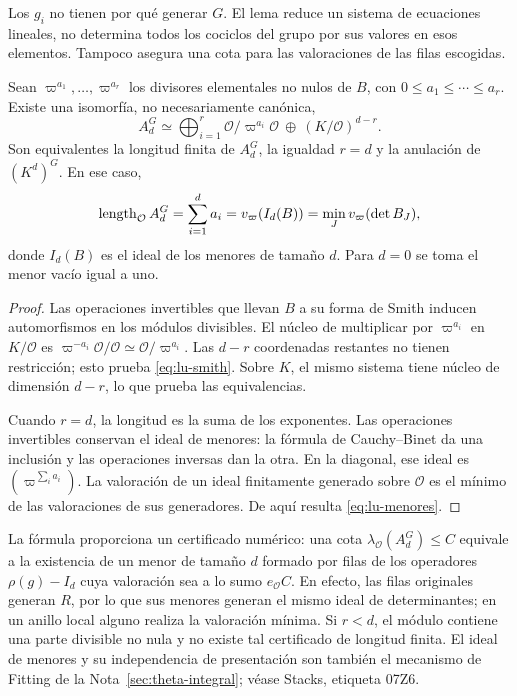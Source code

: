 Los $g_i$ no tienen por qué generar $G$. El lema reduce un sistema
de ecuaciones lineales, no determina todos los cociclos del grupo
por sus valores en esos elementos. Tampoco asegura una cota para
las valoraciones de las filas escogidas.

\begin{proposicion}
\label{prop:lu-smith}
Sean $\varpi^{a_1},\ldots,\varpi^{a_r}$ los divisores elementales
no nulos de $B$, con $0\le a_1\le\cdots\le a_r$. Existe una
isomorfía, no necesariamente canónica,
\begin{equation}
 A_d^G\simeq\bigoplus_{i=1}^r\mathcal O/\varpi^{a_i}\mathcal O
                    \ \oplus\ (K/\mathcal O)^{d-r}.
 \label{eq:lu-smith}
\end{equation}
Son equivalentes la longitud finita de $A_d^G$, la igualdad $r=d$
y la anulación de $(K^d)^G$. En ese caso,
\begin{equation}
 \operatorname{length}_{\mathcal O}A_d^G
   =\sum_{i=1}^d a_i
   =v_\varpi(I_d(B))
   =\min_Jv_\varpi(\det B_J),
 \label{eq:lu-menores}
\end{equation}
donde $I_d(B)$ es el ideal de los menores de tamaño $d$.
Para $d=0$ se toma el menor vacío igual a uno.
\end{proposicion}
\begin{proof}
Las operaciones invertibles que llevan $B$ a su forma de Smith
inducen automorfismos en los módulos divisibles. El núcleo de
multiplicar por $\varpi^{a_i}$ en $K/\mathcal O$ es
$\varpi^{-a_i}\mathcal O/\mathcal O\simeq\mathcal O/\varpi^{a_i}$.
Las $d-r$ coordenadas restantes no tienen restricción; esto prueba
\eqref{eq:lu-smith}. Sobre $K$, el mismo sistema tiene núcleo de
dimensión $d-r$, lo que prueba las equivalencias.

Cuando $r=d$, la longitud es la suma de los exponentes. Las
operaciones invertibles conservan el ideal de menores: la fórmula
de Cauchy--Binet da una inclusión y las operaciones inversas dan
la otra. En la diagonal, ese ideal es
$(\varpi^{\sum_i a_i})$. La valoración de un ideal finitamente
generado sobre $\mathcal O$ es el mínimo de las valoraciones de
sus generadores. De aquí resulta \eqref{eq:lu-menores}.
\end{proof}

La fórmula proporciona un certificado numérico: una cota
$\lambda_{\mathcal O}(A_d^G)\le C$ equivale a la existencia de
un menor de tamaño $d$ formado por filas de los operadores
$\rho(g)-I_d$ cuya valoración sea a lo sumo $e_{\mathcal O}C$.
En efecto, las filas originales generan $R$, por lo que sus
menores generan el mismo ideal de determinantes; en un anillo
local alguno realiza la valoración mínima. Si $r<d$, el módulo
contiene una parte divisible no nula y no existe tal certificado
de longitud finita. El ideal de menores y su independencia de
presentación son también el mecanismo de Fitting de la
Nota~\ref{sec:theta-integral}; véase Stacks, etiqueta 07Z6.

